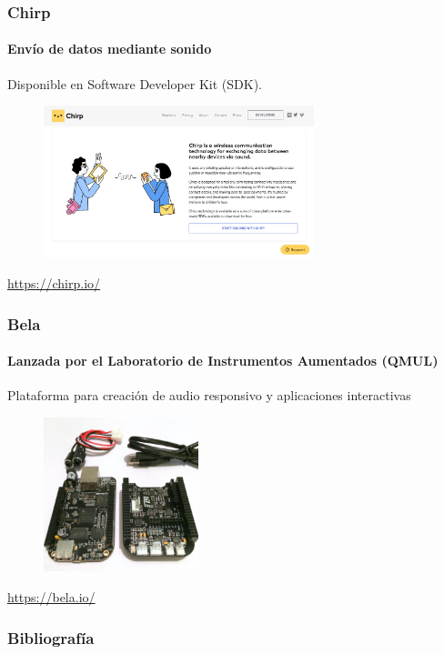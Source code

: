 \documentclass[xcolor=table]{beamer}
\begin{document}
	\begin{frame}
		\frametitle{Chirp}
		\framesubtitle{Envío de datos mediante sonido}
		Disponible en Software Developer Kit (SDK).
		\begin{figure}[h]
    			\centering
    			\includegraphics[width=0.7\textwidth]{images/chirp}
    			\label{fig:8}
    		\end{figure}
		\url{https://chirp.io/}
	\end{frame}
	\begin{frame}
		\frametitle{Bela}
		\framesubtitle{Lanzada por el Laboratorio de Instrumentos Aumentados (QMUL)}
		Plataforma para creación de audio responsivo y aplicaciones interactivas
		\begin{figure}[h]
    			\centering
    			\includegraphics[width=0.4\textwidth]{images/starter-2.jpg}
    			\label{fig:9}
    		\end{figure}
		\url{https://bela.io/}
	\end{frame}
    	\begin{frame}%
        	\frametitle{Bibliografía}
        	{\footnotesize
        		
        		
        	}
        \end{frame}
\end{document}
